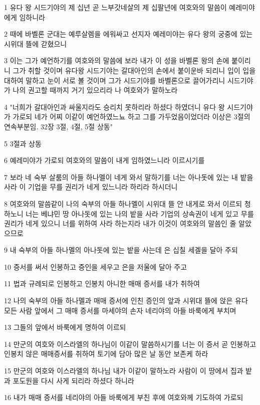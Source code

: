 \par 1 유다 왕 시드기야의 제 십년 곧 느부갓네살의 제 십팔년에 여호와의 말씀이 예레미야에게 임하니라
\par 2 때에 바벨론 군대는 예루살렘을 에워싸고 선지자 예레미야는 유다 왕의 궁중에 있는 시위대 뜰에 갇혔으니
\par 3 이는 그가 예언하기를 여호와의 말씀에 보라 내가 이 성을 바벨론 왕의 손에 붙이리니 그가 취할 것이며 유다왕 시드기야는 갈대아인의 손에서 붙이운바 되리니 입이 입을 대하여 말하고 눈이 서로 볼 것이며 그가 시드기야를 바벨론으로 끌어가리니 시드기야가 나의 권고할 때까지 거기 있으리라 나 여호와가 말하노라
\par 4 "너희가 갈대아인과 싸울지라도 승리치 못하리라 하셨다 하였더니 유다 왕 시드기야가 가로되 네가 어찌 이같이 예언하였느뇨 하고 그를 가두었음이었더라 이상은 3절의 연속부분임. 32장 3절, 4절, 5절 상동"
\par 5 3절과 상동
\par 6 예레미야가 가로되 여호와의 말씀이 내게 임하였느니라 이르시기를
\par 7 보라 네 숙부 살룸의 아들 하나멜이 네게 와서 말하기를 너는 아나돗에 있는 내 밭을 사라 이 기업을 무를 권리가 네게 있느니라 하리라 하시더니
\par 8 여호와의 말씀같이 나의 숙부의 아들 하나멜이 시위대 뜰 안 내게로 와서 이르되 청하노니 너는 베냐민 땅 아나돗에 있는 나의 밭을 사라 기업의 상속권이 네게 있고 무를 권리가 네게 있으니 너를 위하여 사라 하는지라 내가 이것이 여호와의 말씀인 줄 알았으므로
\par 9 내 숙부의 아들 하나멜의 아나돗에 있는 밭을 사는데 은 십칠 세겔을 달아 주되
\par 10 증서를 써서 인봉하고 증인을 세우고 은을 저울에 달아 주고
\par 11 법과 규례되로 인봉하고 인봉치 아니한 매매 증서를 내가 취하여
\par 12 나의 숙부의 아들 하나멜과 매매 증서에 인친 증인의 앞과 시위대 뜰에 앉은 유다 모든 사람 앞에서 그 매매 증서를 마세야의 손자 네리야의 아들 바룩에게 부치며
\par 13 그들의 앞에서 바룩에게 명하여 이르되
\par 14 만군의 여호와 이스라엘의 하나님이 이같이 말씀하시기를 너는 이 증서 곧 인봉하고 인봉치 않은 매매증서를 취하여 토기에 담아 많은 날 동안 보존케 하라
\par 15 만군의 여호와 이스라엘의 하나님 내가 이같이 말하노라 사람이 이 땅에서 집과 밭과 포도원을 다시 사게 되리라 하셨다 하니라
\par 16 내가 매매 증서를 네리야의 아들 바룩에게 부친 후에 여호와께 기도하여 가로되
